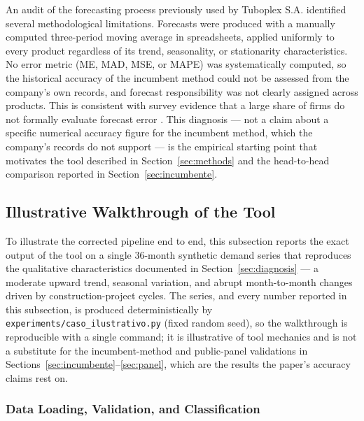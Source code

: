 \documentclass[forecasting,article,submit,pdftex,moreauthors]{Definitions/mdpi}
\begin{document}
An audit of the forecasting process previously used by Tuboplex S.A. identified several methodological limitations. Forecasts were produced with a manually computed three-period moving average in spreadsheets, applied uniformly to every product regardless of its trend, seasonality, or stationarity characteristics. No error metric (ME, MAD, MSE, or MAPE) was systematically computed, so the historical accuracy of the incumbent method could not be assessed from the company's own records, and forecast responsibility was not clearly assigned across products. This is consistent with survey evidence that a large share of firms do not formally evaluate forecast error \cite{kerkkanen2009}. This diagnosis --- not a claim about a specific numerical accuracy figure for the incumbent method, which the company's records do not support --- is the empirical starting point that motivates the tool described in Section~\ref{sec:methods} and the head-to-head comparison reported in Section~\ref{sec:incumbente}.

\subsection{Illustrative Walkthrough of the Tool}
\label{sec:walkthrough}

To illustrate the corrected pipeline end to end, this subsection reports the exact output of the tool on a single 36-month synthetic demand series that reproduces the qualitative characteristics documented in Section~\ref{sec:diagnosis} --- a moderate upward trend, seasonal variation, and abrupt month-to-month changes driven by construction-project cycles. The series, and every number reported in this subsection, is produced deterministically by \texttt{experiments/caso\_ilustrativo.py} (fixed random seed), so the walkthrough is reproducible with a single command; it is illustrative of tool mechanics and is not a substitute for the incumbent-method and public-panel validations in Sections~\ref{sec:incumbente}--\ref{sec:panel}, which are the results the paper's accuracy claims rest on.

\subsubsection{Data Loading, Validation, and Classification}
\end{document}
